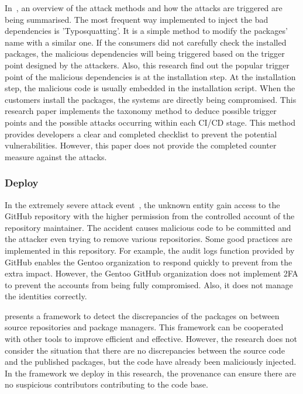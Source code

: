 In~\cite{ohm2020backstabber}, 
an overview of the attack methods and how the attacks are triggered are being summarised. 
The most frequent way implemented to inject the bad dependencies is 'Typosquatting'. It is a simple method
to modify the packages' name with a similar one. If the consumers did not carefully check the installed 
packages, the malicious dependencies will being triggered based on the trigger point designed by the 
attackers. 
Also, this research find out the popular trigger point of the malicious dependencies is at the
installation step. At the installation step, the malicious code is usually embedded in the installation
script. When the customers install the packages, the systems are directly being compromised.  
This research paper implements the taxonomy method to deduce possible trigger points and 
the possible attacks occurring within each CI/CD stage. This method provides developers a clear 
and completed checklist to prevent the potential vulnerabilities. However, this paper does not
provide the completed counter measure against the attacks.

\subsubsection{Deploy}
In the extremely severe attack event~\cite{gentoo-incident-report}, 
the unknown entity gain access to the GitHub repository with the higher permission from the controlled
account of the repository maintainer. The accident causes malicious code to be committed and the
attacker even trying to remove various repositories. Some good practices are implemented
in this repository. For example, the audit logs function provided by GitHub enables the Gentoo organization
to respond quickly to prevent from the extra impact. However, the Gentoo GitHub organization does not
implement 2FA to prevent the accounts from being fully compromised. Also, it does not manage the identities
correctly.

\cite{vu2021lastpymile} presents a framework to detect the discrepancies of the packages on 
between source repositories and package managers. This framework can be cooperated with other tools to improve
efficient and effective. However, the research does not consider the situation that there are no
discrepancies between the source code and the published packages, but the code have already been maliciously injected.
In the framework we deploy in this research, the provenance can ensure there are no suspicious contributors contributing
to the code base. 

